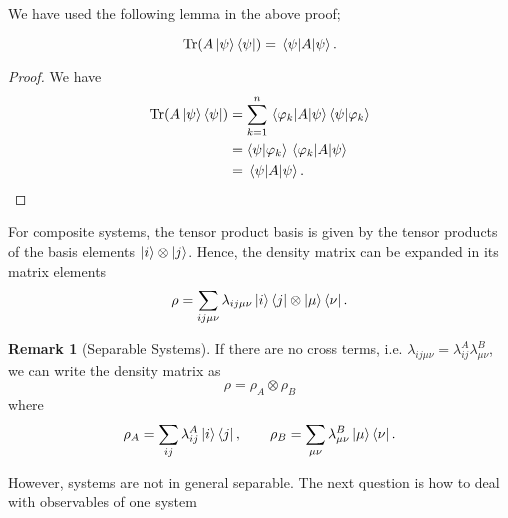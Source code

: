 \documentclass[twoside,symmetric, openany, 12pt]{./tuftebook}
\theoremstyle{definition}
\newtheorem{Remark}[Theorem]{Remark}
\theoremstyle{definition}
\theoremstyle{definition}
\begin{document}
We have used the following lemma in the above proof;
\begin{Lemma}
	\[
		\Tr(A \ket{\psi}\bra{\psi}) = \matrixelement{\psi}{A}{\psi}
	.\] 
\end{Lemma}
\begin{proof}
	We have
	\begin{align*}
	\Tr(A \ket{\psi}\bra{\psi}) &= \sum_{k=1}^n \matrixelement{\varphi_k}{A}{\psi}\braket{\psi}{\varphi_k}\\
					    &= \braket{\psi}{\varphi_k} \matrixelement{\varphi_k}{A}{\psi}\\
					    &= \matrixelement{\psi}{A}{\psi}.\qedhere
	\end{align*}
\end{proof}
\begin{Proposition}
	For composite systems, the tensor product basis is given by the tensor products of the basis elements $\ket{i} \otimes \ket{j}$. Hence, the density matrix can be expanded in its matrix elements
	\[
		\rho = \sum_{ij\mu\nu}\lambda_{ij\mu\nu} \ket{i}\bra{j}\otimes \ket{\mu}\bra{\nu}
	.\] 
\end{Proposition}
\begin{Remark}[Separable Systems]
	If there are no cross terms, i.e. $\lambda_{ij\mu\nu}=\lambda_{ij}^A\lambda_{\mu\nu}^B$, we can write the density matrix as
	\[
	\rho = \rho_A \otimes \rho_B
\]
where
\[
	\rho_A = \sum_{ij} \lambda_{ij}^A \ket{i}\bra{j},\qquad \rho_B = \sum_{\mu\nu} \lambda_{\mu\nu}^B \ket{\mu}\bra{\nu}
.\] 
\end{Remark}
However, systems are not in general separable. The next question is how to deal with observables of one system
\end{document}
